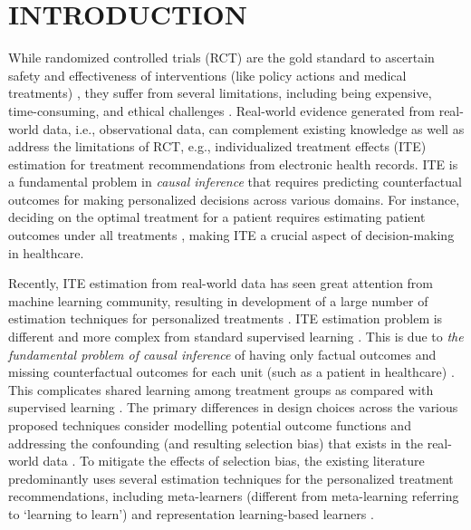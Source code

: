 \documentclass{article}
\begin{document}
\section{INTRODUCTION}
\label{sec_intro}
While randomized controlled trials (RCT) are the gold standard to ascertain safety and effectiveness of interventions (like policy actions and medical treatments) \cite{pearl2009causality}, they suffer from several limitations, including being expensive, time-consuming, and ethical challenges \cite{bica2021real}. Real-world evidence generated from real-world data, i.e., observational data, can complement existing knowledge as well as address the limitations of RCT, e.g., individualized treatment effects (ITE) estimation for treatment recommendations from electronic health records. ITE is a fundamental problem in \textit{causal inference} that requires predicting counterfactual outcomes \cite{rubin2005causal} for making personalized decisions across various domains. For instance, deciding on the optimal treatment for a patient requires estimating patient outcomes under all treatments \cite{athey2016recursive}, making ITE a crucial aspect of decision-making in healthcare.

Recently, ITE estimation from real-world data has seen great attention from machine learning community, resulting in development of a large number of estimation techniques for personalized treatments \cite{curth2021nonparametric,curth2021inductive,curth2023search,curth2023understanding,chauhan2023adversarial,xue2023assisting,berrevoets2023impute,guo2023estimating,wen2023variational}. ITE estimation problem is different and more complex from standard supervised learning \cite{rubin2005causal,pearl2009causality,wager2018estimation}. This is due to \textit{the fundamental problem of causal inference} of having only factual outcomes and missing counterfactual outcomes for each unit (such as a patient in healthcare) \cite{holland1986statistics}. This complicates shared learning among treatment groups as compared with supervised learning \cite{bica2022transfer}. The primary differences in design choices across the various proposed techniques consider modelling potential outcome functions and addressing the confounding (and resulting selection bias) that exists in the real-world data \cite{curth2021inductive,curth2021nonparametric,kuang2019treatment,kunzel2019metalearners,shi2019adapting,kennedy2022optimal,zhang2021treatment,chauhan2023adversarial,wager2018estimation,nilforoshan2023zero}. To mitigate the effects of selection bias, the existing literature predominantly uses several estimation techniques for the personalized treatment recommendations, including meta-learners (different from meta-learning referring to `learning to learn’) \cite{kunzel2019metalearners,kennedy2022optimal,nie2021quasi,curth2021nonparametric} and representation learning-based learners \cite{johansson2016learning,curth2021nonparametric,shi2019adapting,chauhan2023adversarial,guo2023estimating}.
\end{document}
